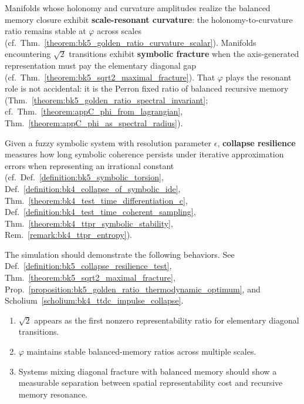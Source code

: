 \begin{remark}
\label{remark:bk5_curvature_vs_chaos}
Manifolds whose holonomy and curvature amplitudes realize the balanced memory
closure exhibit \textbf{scale-resonant curvature}: the holonomy-to-curvature
ratio remains stable at $\varphi$ across scales
(cf.~Thm.~\ref{theorem:bk5_golden_ratio_curvature_scalar}).  Manifolds
encountering $\sqrt{2}$ transitions exhibit \textbf{symbolic fracture} when the
axis-generated representation must pay the elementary diagonal gap
(cf.~Thm.~\ref{theorem:bk5_sqrt2_maximal_fracture}).  That $\varphi$
plays the resonant role is not accidental: it is the Perron fixed ratio of
balanced recursive memory (Thm.~\ref{theorem:bk5_golden_ratio_spectral_invariant};
cf.~Thm.~\ref{theorem:appC_phi_from_lagrangian},
Thm.~\ref{theorem:appC_phi_as_spectral_radius}).
\end{remark}

\begin{definition}
\label{definition:bk5_collapse_resilience_test}
Given a fuzzy symbolic system with resolution parameter $\epsilon$, \textbf{collapse resilience} measures how long symbolic coherence persists under iterative approximation errors when representing an irrational constant (cf.~Def.~\ref{definition:bk5_symbolic_torsion}, Def.~\ref{definition:bk4_collapse_of_symbolic_ide}, Thm.~\ref{theorem:bk4_test_time_differentiation_c}, Def.~\ref{definition:bk4_test_time_coherent_sampling}, Thm.~\ref{theorem:bk4_ttpr_symbolic_stability}, Rem.~\ref{remark:bk4_ttpr_entropy}).
\end{definition}

\begin{scholium}
\label{scholium:bk5_experimental_predictions}
The simulation should demonstrate the following behaviors.
See Def.~\ref{definition:bk5_collapse_resilience_test},
Thm.~\ref{theorem:bk5_sqrt2_maximal_fracture},
Prop.~\ref{proposition:bk5_golden_ratio_thermodynamic_optimum}, and
Scholium~\ref{scholium:bk4_ttdc_impulse_collapse}.
\begin{enumerate}
  \item $\sqrt{2}$ appears as the first nonzero representability ratio for elementary diagonal transitions.
  \item $\varphi$ maintains stable balanced-memory ratios across multiple scales.
  \item Systems mixing diagonal fracture with balanced memory should show a measurable separation between spatial representability cost and recursive memory resonance.
\end{enumerate}
\end{scholium}


